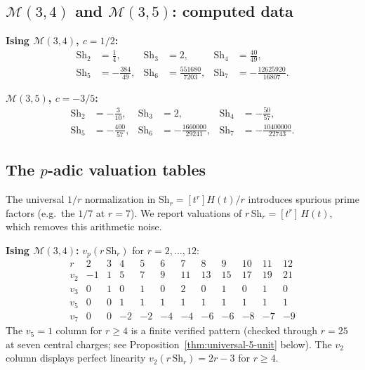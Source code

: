 \documentclass[11pt]{article}
\newcommand{\cM}{\mathcal{M}}
\begin{document}
\subsection*{$\cM(3,4)$ and $\cM(3,5)$: computed data}

\noindent\textbf{Ising $\cM(3,4)$, $c = 1/2$:}
\begin{align*}
\mathrm{Sh}_2 &= \tfrac{1}{4}, &
\mathrm{Sh}_3 &= 2, &
\mathrm{Sh}_4 &= \tfrac{40}{49}, \\
\mathrm{Sh}_5 &= -\tfrac{384}{49}, &
\mathrm{Sh}_6 &= \tfrac{551680}{7203}, &
\mathrm{Sh}_7 &= -\tfrac{12625920}{16807}.
\end{align*}

\noindent\textbf{$\cM(3,5)$, $c = -3/5$:}
\begin{align*}
\mathrm{Sh}_2 &= -\tfrac{3}{10}, &
\mathrm{Sh}_3 &= 2, &
\mathrm{Sh}_4 &= -\tfrac{50}{57}, \\
\mathrm{Sh}_5 &= -\tfrac{400}{57}, &
\mathrm{Sh}_6 &= -\tfrac{1660000}{29241}, &
\mathrm{Sh}_7 &= -\tfrac{10400000}{22743}.
\end{align*}

\subsection*{The $p$-adic valuation tables}

The universal $1/r$ normalization in
$\mathrm{Sh}_r = [t^r] H(t) / r$ introduces spurious
prime factors (e.g.\ the $1/7$ at $r = 7$).  We report
valuations of $r\,\mathrm{Sh}_r = [t^r]\,H(t)$, which
removes this arithmetic noise.

\medskip
\noindent\textbf{Ising $\cM(3,4)$:}
$v_p(r\,\mathrm{Sh}_r)$ for $r = 2, \ldots, 12$:
\[
\begin{array}{c|rrrrrrrrrrr}
r & 2 & 3 & 4 & 5 & 6 & 7 & 8 & 9 & 10 & 11 & 12 \\
\hline
v_2 & -1 & 1 & 5 & 7 & 9 & 11 & 13 & 15 & 17 & 19 & 21 \\
v_3 & 0 & 1 & 0 & 1 & 0 & 2 & 0 & 1 & 0 & 1 & 0 \\
v_5 & 0 & 0 & 1 & 1 & 1 & 1 & 1 & 1 & 1 & 1 & 1 \\
v_7 & 0 & 0 & -2 & -2 & -4 & -4 & -6 & -6 & -8 & -7 & -9
\end{array}
\]
The $v_5 = 1$ column for $r \ge 4$ is a finite verified pattern
(checked through $r = 25$ at seven central charges; see
Proposition~\ref{thm:universal-5-unit} below).
The $v_2$ column displays perfect linearity
$v_2(r\,\mathrm{Sh}_r) = 2r - 3$ for $r \ge 4$.
\end{document}
